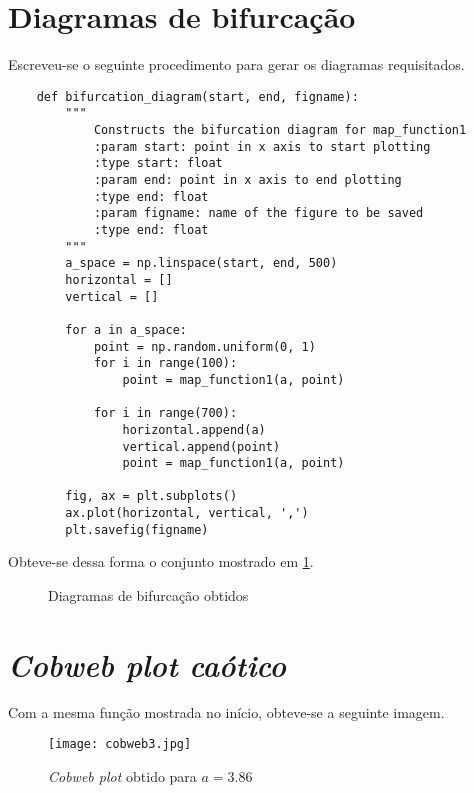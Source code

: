 \documentclass{article}[twocolumn]
\begin{document}
	\section{Diagramas de bifurcação}
	Escreveu-se o seguinte procedimento para gerar os diagramas requisitados.
	\begin{verbatim}
	def bifurcation_diagram(start, end, figname):
    	"""
        	Constructs the bifurcation diagram for map_function1
        	:param start: point in x axis to start plotting
        	:type start: float
        	:param end: point in x axis to end plotting
        	:type end: float
        	:param figname: name of the figure to be saved
        	:type end: float
    	"""
    	a_space = np.linspace(start, end, 500)
    	horizontal = []
    	vertical = []
	
    	for a in a_space:
        	point = np.random.uniform(0, 1)
        	for i in range(100):
            	point = map_function1(a, point)
		
        	for i in range(700):
            	horizontal.append(a)
            	vertical.append(point)
            	point = map_function1(a, point)
	
    	fig, ax = plt.subplots()
    	ax.plot(horizontal, vertical, ',')
    	plt.savefig(figname)
	\end{verbatim}
	Obteve-se dessa forma o conjunto mostrado em \ref{fig:bifurcation}.
	\begin{figure}[H]
		\centering
		\begin{subfigure}{
			\texttt{[image: bifurcation1.jpg]}
		}\end{subfigure}
		\begin{subfigure}{
			\texttt{[image: bifurcation2.jpg]}
		}\end{subfigure}
		\begin{subfigure}{
			\texttt{[image: bifurcation3.jpg]}
		}\end{subfigure}
		\caption{Diagramas de bifurcação obtidos}
		\label{fig:bifurcation}
	\end{figure}
	\section{\textit{Cobweb plot caótico}}
	Com a mesma função mostrada no início, obteve-se a seguinte imagem.
	\begin{figure}[H]
		\centering
		\texttt{[image: cobweb3.jpg]}
		\caption{\textit{Cobweb plot} obtido para $a = 3.86$}
	\end{figure}
\end{document}
